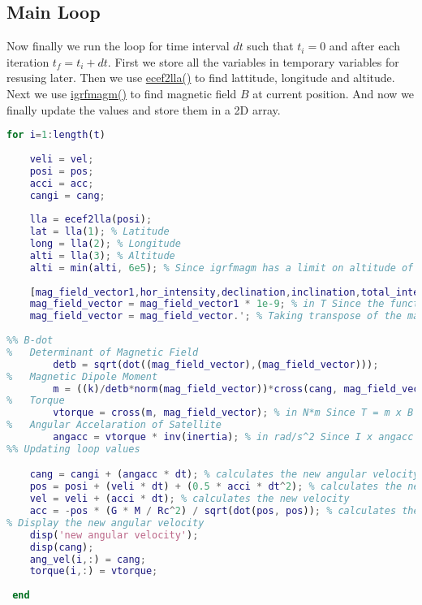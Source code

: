 \documentclass[11pt]{article}
\begin{document}
\subsection{Main Loop}
Now finally we run the loop for time interval $dt$ such that $t_i=0$ and after each iteration $t_f=t_i+dt$. First we store all the variables in temporary variables for resusing later. Then we use \href{https://in.mathworks.com/help/aerotbx/ug/ecef2lla.html}{ecef2lla()}
to find lattitude, longitude and altitude. Next we use \href{https://in.mathworks.com/help/aerotbx/ug/igrfmagm.html}{igrfmagm()} to find magnetic field $B$ at current position. And now we finally update the values and store them in a 2D array.
\begin{lstlisting}[language=MATLAB]
for i=1:length(t)
     
    veli = vel;
    posi = pos;
    acci = acc;
    cangi = cang;
    
    lla = ecef2lla(posi);
    lat = lla(1); % Latitude
    long = lla(2); % Longitude
    alti = lla(3); % Altitude
    alti = min(alti, 6e5); % Since igrfmagm has a limit on altitude of 6e5
    
    [mag_field_vector1,hor_intensity,declination,inclination,total_intensity] = igrfmagm(alti,lat,long,decyear(2015,7,4),12); % igrfmagm used to calculate the magnetic field of earth at particular position
    mag_field_vector = mag_field_vector1 * 1e-9; % in T Since the function returns the value in nT
    mag_field_vector = mag_field_vector.'; % Taking transpose of the magnetic feild
    
%% B-dot
%   Determinant of Magnetic Field
        detb = sqrt(dot((mag_field_vector),(mag_field_vector)));
%   Magnetic Dipole Moment
        m = ((k)/detb*norm(mag_field_vector))*cross(cang, mag_field_vector); % in A*m^2 Since m = -k (w x b)/||B||
%   Torque
        vtorque = cross(m, mag_field_vector); % in N*m Since T = m x B
%   Angular Accelaration of Satellite
        angacc = vtorque * inv(inertia); % in rad/s^2 Since I x angacc = T
%% Updating loop values

    cang = cangi + (angacc * dt); % calculates the new angular velocity
    pos = posi + (veli * dt) + (0.5 * acci * dt^2); % calculates the new position assuming constant acc for dt time
    vel = veli + (acci * dt); % calculates the new velocity
    acc = -pos * (G * M / Rc^2) / sqrt(dot(pos, pos)); % calculates the new acceleration
% Display the new angular velocity
    disp('new angular velocity');
    disp(cang);
    ang_vel(i,:) = cang;
    torque(i,:) = vtorque;
     
 end
\end{lstlisting}
\end{document}
